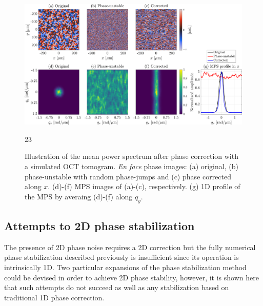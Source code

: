 \begin{figure}[htb!]
	\centering
	\includegraphics[width=\textwidth]{Figures/SHARP/PhaseStabilization/PhaseStabiliaztion1D-enface.pdf}
	\caption[Illustration of the mean power spectrum after phase correction with a simulated OCT tomogram.]{Illustration of the mean power spectrum after phase correction with a simulated OCT tomogram. \textit{En face} phase images: (a) original, (b) phase-unstable with random phase-jumps and (c) phase corrected along $x$. (d)-(f) MPS images of (a)-(c), respectively. (g) 1D profile of the MPS by averaing (d)-(f) along $q_y$.}
	\label{fig:PhaseStable1D-enface} 
23

\end{figure}
\FloatBarrier

\subsection{Attempts to 2D phase stabilization}

The presence of 2D phase noise requires a 2D correction but the fully numerical phase stabilization described previously is insufficient since its operation is intrinsically 1D. Two particular expansions of the phase stabilization method could be devised in order to achieve 2D phase stability, however, it is shown here that such attempts do not succeed as well as any stabilization based on traditional 1D phase correction.

